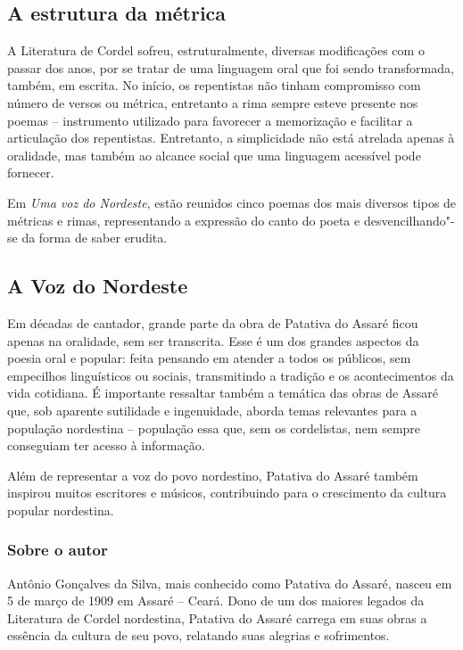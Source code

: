 \documentclass[12pt]{extarticle}
\begin{document}
\subsection{A estrutura da métrica}

A Literatura de Cordel sofreu, estruturalmente, diversas modificações
com o passar dos anos, por se tratar de uma linguagem oral que foi sendo
transformada, também, em escrita. No início, os repentistas não tinham
compromisso com número de versos ou métrica, entretanto a rima sempre
esteve presente nos poemas -- instrumento utilizado para favorecer a
memorização e facilitar a articulação dos repentistas. Entretanto, a
simplicidade não está atrelada apenas à oralidade, mas também ao alcance
social que uma linguagem acessível pode fornecer.

Em \emph{Uma voz do Nordeste}, estão reunidos cinco poemas dos mais
diversos tipos de métricas e rimas, representando a expressão do canto
do poeta e desvencilhando"-se da forma de saber erudita.

\subsection{A Voz do Nordeste}

Em décadas de cantador, grande parte da obra de Patativa do Assaré ficou
apenas na oralidade, sem ser transcrita. Esse é um dos grandes aspectos
da poesia oral e popular: feita pensando em atender a todos os públicos,
sem empecilhos linguísticos ou sociais, transmitindo a tradição e os
acontecimentos da vida cotidiana. É importante ressaltar também a
temática das obras de Assaré que, sob aparente sutilidade e ingenuidade,
aborda temas relevantes para a população nordestina -- população essa
que, sem os cordelistas, nem sempre conseguiam ter acesso à informação.

Além de representar a voz do povo nordestino, Patativa do Assaré também
inspirou muitos escritores e músicos, contribuindo para o crescimento da
cultura popular nordestina.

\subsubsection{Sobre o autor}

Antônio Gonçalves da Silva, mais conhecido como Patativa do Assaré,
nasceu em 5 de março de 1909 em Assaré -- Ceará. Dono de um dos maiores
legados da Literatura de Cordel nordestina, Patativa do Assaré carrega
em suas obras a essência da cultura de seu povo, relatando suas alegrias
e sofrimentos.
\end{document}
